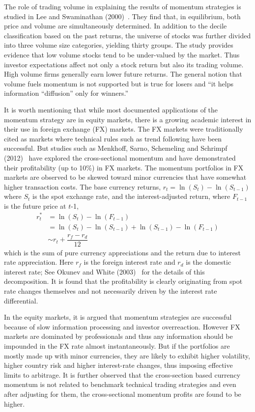 The role of trading volume in explaining the results of momentum strategies is studied in Lee and Swaminathan (2000)~\cite{lee2000}. They find that, in equilibrium, both price and volume are simultaneously determined. In addition to the decile classification based on the past returns, the universe of stocks was further divided into three volume size categories, yielding thirty groups. The study provides evidence that low volume stocks tend to be under-valued by the market. Thus investor expectations affect not only a stock return but also its trading volume. High volume firms generally earn lower future returns. The general notion that volume fuels momentum is not supported but is true for losers and ``it helps information ``diffusion'' only for winners.''


It is worth mentioning that while most documented applications of the momentum strategy are in equity markets, there is a growing academic interest in their use in foreign exchange (FX) markets. The FX markets were traditionally cited as markets where technical rules such as trend following have been successful. But studies such as Menkhoff, Sarno, Schemeling and Schrimpf (2012)~\cite{menkhoff2012} have explored the cross-sectional momentum and have demonstrated their profitability (up to 10\%) in FX markets. The momentum portfolios in FX markets are observed to be skewed toward minor currencies that have somewhat higher transaction costs. The base currency returns, $r_t= \ln(S_t) - \ln(S_{t-1})$ where $S_t$ is the spot exchange rate, and the interest-adjusted return, where $F_{t-1}$ is the future price at $t$-1,
	\begin{equation}
	\begin{split}
	r_t^* &= \ln(S_t) - \ln(F_{t-1}) \\
	&= \ln(S_t) - \ln(S_{t-1}) + \ln(S_{t-1}) - \ln(F_{t-1}) \\
	&\sim r_t + \dfrac{r_f - r_d}{12}
	\end{split}
	\end{equation}
which is the sum of pure currency appreciations and the return due to interest rate appreciation. Here $r_f$ is the foreign interest rate and $r_d$ is the domestic interest rate; See Okunev and White (2003)~\cite{okunev2003} for the details of this decomposition. It is found that the profitability is clearly originating from spot rate changes themselves and not necessarily driven by the interest rate differential.


In the equity markets, it is argued that momentum strategies are successful because of slow information processing and investor overreaction. However FX markets are dominated by professionals and thus any information should be impounded in the FX rate almost instantaneously. But if the portfolios are mostly made up with minor currencies, they are likely to exhibit higher volatility, higher country risk and higher interest-rate changes, thus imposing effective limits to arbitrage. It is further observed that the cross-section based currency momentum is not related to benchmark technical trading strategies and even after adjusting for them, the cross-sectional momentum profits are found to be higher. \\


